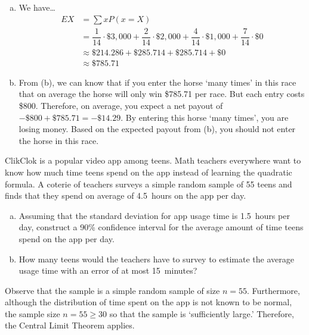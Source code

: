 \documentclass[12pt,letterpaper]{exam}
\begin{document}
\begin{questions}
\begin{enumerate}[(a)]
\item We have\dots
	\[
	\begin{aligned}
	EX &= \sum x P(x = X) \\[0.3cm]
	&= \dfrac{1}{14} \cdot \$3,\!000 + \dfrac{2}{14} \cdot \$2,\!000 + \dfrac{4}{14} \cdot \$1,\!000 + \dfrac{7}{14} \cdot \$0 \\[0.3cm]
	&\approx \$214.286 + \$285.714 + \$285.714 + \$0 \\[0.3cm]
	&\approx \$785.71
	\end{aligned}
	\] \pspace

\item From (b), we can know that if you enter the horse `many times' in this race that on average the horse will only win \$785.71 per race. But each entry costs \$800. Therefore, on average, you expect a net payout of $-\$800 + \$785.71= -\$14.29$. By entering this horse `many times', you are losing money. Based on the expected payout from (b), you should not enter the horse in this race. 
\end{enumerate}



\newpage
\question[15] ClikClok is a popular video app among teens. Math teachers everywhere want to know how much time teens spend on the app instead of learning the quadratic formula. A coterie of teachers surveys a simple random sample of 55 teens and finds that they spend on average of 4.5~hours on the app per day. 
	\begin{enumerate}[(a)]
	\item Assuming that the standard deviation for app usage time is 1.5~hours per day, construct a 90\% confidence interval for the average amount of time teens spend on the app per day.
	\item How many teens would the teachers have to survey to estimate the average usage time with an error of at most 15~minutes? 
	\end{enumerate} 

\sol Observe that the sample is a simple random sample of size $n= 55$. Furthermore, although the distribution of time spent on the app is not known to be normal, the sample size $n= 55 \geq 30$ so that the sample is `sufficiently large.' Therefore, the Central Limit Theorem applies.


\end{questions}
\end{document}
